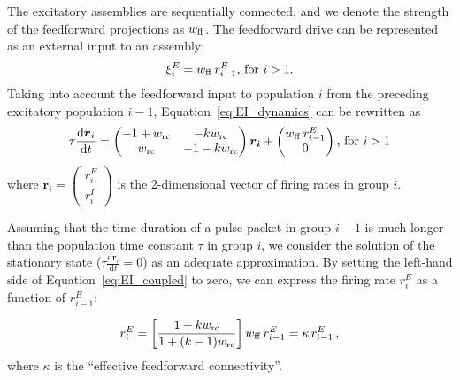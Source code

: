     The excitatory assemblies are sequentially connected, and we denote the
    strength of the feedforward projections as $w_{\rm ff}$. The feedforward
    drive can be represented as an external input to an assembly:
    \[
      \xi_{i}^{E}
    =  w_{\rm ff} \, r_{i-1}^{E} \text{, for $i>1$.}
    \]
    Taking into account the feedforward input to population $i$ from the
    preceding excitatory population $i-1$, Equation~\ref{eq:EI_dynamics} can be
    rewritten as
    \begin{equation}
      \tau \frac{\text{d} \boldsymbol{r}_{i}}{\text{d}t} = \begin{pmatrix} -1+w_{\rm rc} &-kw_{\rm rc} \\ w_{\rm rc} &-1-kw_{\rm rc}\\ \end{pmatrix}\boldsymbol{r_{i}} + \begin{pmatrix} w_{\rm ff} \, r_{i-1}^E \\ 0 \end{pmatrix} \text{, for $i>1$}
      \label{eq:EI_coupled}
    \end{equation}
    where $\boldsymbol{r}_i = \begin{pmatrix} r_i^E \\ r_i^I \end{pmatrix}$ is
    the 2-dimensional vector of firing rates in group $i$.

    Assuming that the time duration of a pulse packet in group $i-1$ is much
    longer than the population time constant $\tau$ in group $i$, we consider
    the solution of the stationary state ($\tau \frac{\text{d}
    \boldsymbol{r}_{i}}{\text{d}t} =0$) as an adequate approximation. By
    setting the left-hand side of Equation~\ref{eq:EI_coupled} to zero, we can
    express the firing rate $r^E_i$ as a function of $r^E_{i-1}$:
    
    \begin{equation} 
      r_{i}^E = \left[ \frac{1+kw_{\rm rc}}{1+(k-1)w_{\rm rc}}  \right] w_{\rm ff} \, r_{i-1}^E =  \kappa\, r_{i-1}^E \,,
            \label{eq:ri_linear1}
    \end{equation}
    where $\kappa$ is the ``effective feedforward connectivity''.  
    
